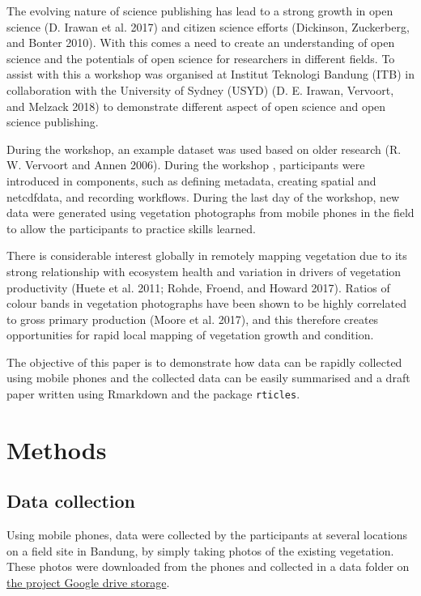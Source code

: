 \documentclass[]{elsarticle} %
\begin{document}
The evolving nature of science publishing has lead to a strong growth in
open science (D. Irawan et al. 2017) and citizen science efforts
(Dickinson, Zuckerberg, and Bonter 2010). With this comes a need to
create an understanding of open science and the potentials of open
science for researchers in different fields. To assist with this a
workshop was organised at Institut Teknologi Bandung (ITB) in
collaboration with the University of Sydney (USYD) (D. E. Irawan,
Vervoort, and Melzack 2018) to demonstrate different aspect of open
science and open science publishing.

During the workshop, an example dataset was used based on older research
(R. W. Vervoort and Annen 2006). During the workshop , participants were
introduced in components, such as defining metadata, creating spatial
and netcdfdata, and recording workflows. During the last day of the
workshop, new data were generated using vegetation photographs from
mobile phones in the field to allow the participants to practice skills
learned.

There is considerable interest globally in remotely mapping vegetation
due to its strong relationship with ecosystem health and variation in
drivers of vegetation productivity (Huete et al. 2011; Rohde, Froend,
and Howard 2017). Ratios of colour bands in vegetation photographs have
been shown to be highly correlated to gross primary production (Moore et
al. 2017), and this therefore creates opportunities for rapid local
mapping of vegetation growth and condition.

The objective of this paper is to demonstrate how data can be rapidly
collected using mobile phones and the collected data can be easily
summarised and a draft paper written using Rmarkdown and the package
\texttt{rticles}.

\section{Methods}\label{methods}

\subsection{Data collection}\label{data-collection}

Using mobile phones, data were collected by the participants at several
locations on a field site in Bandung, by simply taking photos of the
existing vegetation. These photos were downloaded from the phones and
collected in a data folder on
\href{https://drive.google.com/drive/folders/1jgMlC3NbL_7dFVb29AjNflgxqPj6LLMf?usp=sharing}{the
project Google drive storage}.
\end{document}
